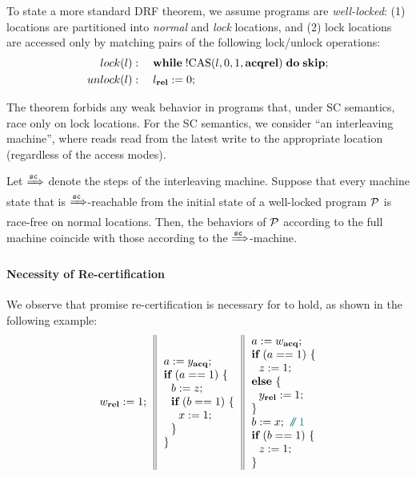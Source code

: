 To state a more standard DRF theorem, 
we assume programs are \emph{well-locked}:
(1) locations are partitioned into \emph{normal} and \emph{lock} locations, and
(2) lock locations are accessed only by matching pairs of the following lock/unlock operations:
\begin{align*}
lock(l) & : \quad \textbf{while}\;!\textrm{CAS}({l},{0},{1},{\textbf{acq}\textbf{rel}})\;\textbf{do}\;\textbf{skip}; \\
unlock(l) & : \quad l_{\textbf{rel}} := 0; 
\end{align*}

The theorem forbids any weak behavior in programs that, under SC semantics, race only on lock locations.
For the SC semantics, we consider ``an interleaving machine'', 
where reads read from the latest write to the appropriate location
(regardless of the access modes).

\begin{theorem}
\label{thm:drflock}
Let $\xRightarrow{{\texttt{sc}}}$ denote the steps of the interleaving machine.
Suppose that every machine state that is $\xRightarrow{{\texttt{sc}}}$-reachable from
the initial state of a well-locked program $\mathcal{P}$ is race-free on normal locations.
Then, the behaviors of $\mathcal{P}$ according to the full machine coincide with those
according to the $\xRightarrow{{\texttt{sc}}}$-machine.
\end{theorem}


\paragraph{Necessity of Re-certification}

We observe that promise re-certification is necessary for  to hold, as
shown in the following example:
\[
\inarrIII{ w_{\relw}:=1; }
         { a:=y_{\acqr}; \\
           \kw{if}~(a == 1)~\{ \\
           ~~b:=z; \\
           ~~\kw{if}~(b == 1)~\{ \\
           ~~~~x:=1; \\
           ~~\} \\
           \}
         }
         { a:=w_{\acqr}; \\
           \kw{if}~(a == 1)~\{ \\
           ~~z:=1; \\
           \kw{else}~\{ \\
           ~~y_{\relw}:=1; \\
           \} \\
           b:=x; \comment{1} \\
           \kw{if}~(b == 1)~\{ \\
           ~~z:=1; \\
           \}
         }
\]

